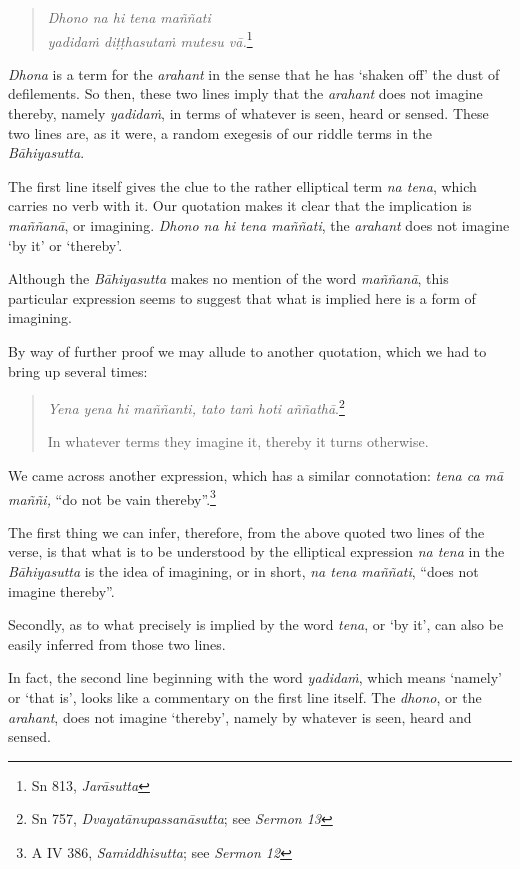 \begin{quote}
\emph{Dhono na hi tena maññati}\\
\emph{yadidaṁ diṭṭhasutaṁ mutesu vā.}\footnote{Sn 813, \emph{Jarāsutta}}
\end{quote}

\emph{Dhona} is a term for the \emph{arahant} in the sense that he has `shaken off' the dust of defilements. So then, these two lines imply that the \emph{arahant} does not imagine thereby, namely \emph{yadidaṁ}, in terms of whatever is seen, heard or sensed. These two lines are, as it were, a random exegesis of our riddle terms in the \emph{Bāhiyasutta}.

The first line itself gives the clue to the rather elliptical term \emph{na tena}, which carries no verb with it. Our quotation makes it clear that the implication is \emph{maññanā}, or imagining. \emph{Dhono na hi tena maññati}, the \emph{arahant} does not imagine `by it' or `thereby'.

Although the \emph{Bāhiyasutta} makes no mention of the word \emph{maññanā}, this particular expression seems to suggest that what is implied here is a form of imagining.

By way of further proof we may allude to another quotation, which we had to bring up several times:

\begin{quote}
\emph{Yena yena hi maññanti, tato taṁ hoti aññathā}.\footnote{Sn 757, \emph{Dvayatānupassanāsutta}; see \emph{Sermon 13}}

In whatever terms they imagine it, thereby it turns otherwise.
\end{quote}

We came across another expression, which has a similar connotation: \emph{tena ca mā maññi,} ``do not be vain thereby''.\footnote{A IV 386, \emph{Samiddhisutta}; see \emph{Sermon 12}}

The first thing we can infer, therefore, from the above quoted two lines of the verse, is that what is to be understood by the elliptical expression \emph{na tena} in the \emph{Bāhiyasutta} is the idea of imagining, or in short, \emph{na tena maññati}, ``does not imagine thereby''.

Secondly, as to what precisely is implied by the word \emph{tena}, or `by it', can also be easily inferred from those two lines.

In fact, the second line beginning with the word \emph{yadidaṁ}, which means `namely' or `that is', looks like a commentary on the first line itself. The \emph{dhono}, or the \emph{arahant}, does not imagine `thereby', namely by whatever is seen, heard and sensed.

